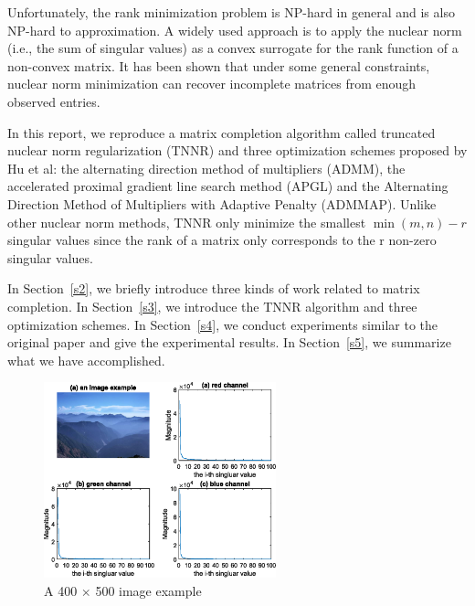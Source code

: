 \documentclass{article}
\begin{document}
{Unfortunately, the rank minimization problem is NP-hard in general and is also NP-hard to approximation.  A widely used approach is to apply the nuclear norm (i.e., the sum of singular values) as a convex surrogate for the rank function of a non-convex matrix. It has been shown that under some general constraints, nuclear norm minimization can recover incomplete matrices from enough observed entries.

In this report, we reproduce a matrix completion algorithm called truncated nuclear norm regularization (TNNR) and three optimization schemes proposed by Hu et al\cite{hu.he201309}: the alternating direction method of multipliers (ADMM), the accelerated proximal gradient line search method (APGL) and the Alternating Direction Method of Multipliers with Adaptive Penalty (ADMMAP). 
Unlike other nuclear norm methods, TNNR only minimize the smallest $\min(m, n) - r$  singular values since the rank of a matrix only corresponds to the r non-zero singular values. 

In Section~\ref{s2}, we briefly introduce three kinds of work related to matrix completion. In Section~\ref{s3}, we introduce the TNNR algorithm and three optimization schemes. In Section~\ref{s4}, we conduct experiments similar to the original paper and give the experimental results. In Section~\ref{s5}, we summarize what we have accomplished.

\begin{figure}[htbp]
    \centering
    \includegraphics[width=0.6\textwidth]{assets/fig1.eps}
    \caption{A 400 $\times$ 500 image example}
    \label{fig1}
\end{figure}

}
\end{document}
